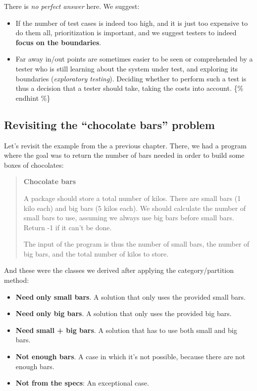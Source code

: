 There is \emph{no perfect answer} here. We suggest:

\begin{itemize}
\tightlist
\item
  If the number of test cases is indeed too high, and it is just too
  expensive to do them all, prioritization is important, and we suggest
  testers to indeed \textbf{focus on the boundaries}.
\item
  Far away in/out points are sometimes easier to be seen or comprehended
  by a tester who is still learning about the system under test, and
  exploring its boundaries (\emph{exploratory testing}). Deciding
  whether to perform such a test is thus a decision that a tester should
  take, taking the costs into account. \{\% endhint \%\}
\end{itemize}

\hypertarget{revisiting-the-chocolate-bars-problem}{%
\subsection{Revisiting the ``chocolate bars''
problem}\label{revisiting-the-chocolate-bars-problem}}

Let's revisit the example from the a previous chapter. There, we had a
program where the goal was to return the number of bars needed in order
to build some boxes of chocolates:

\begin{quote}
\textbf{Chocolate bars}

A package should store a total number of kilos. There are small bars (1
kilo each) and big bars (5 kilos each). We should calculate the number
of small bars to use, assuming we always use big bars before small bars.
Return -1 if it can't be done.

The input of the program is thus the number of small bars, the number of
big bars, and the total number of kilos to store.
\end{quote}

And these were the classes we derived after applying the
category/partition method:

\begin{itemize}
\tightlist
\item
  \textbf{Need only small bars}. A solution that only uses the provided
  small bars.
\item
  \textbf{Need only big bars}. A solution that only uses the provided
  big bars.
\item
  \textbf{Need small + big bars}. A solution that has to use both small
  and big bars.
\item
  \textbf{Not enough bars}. A case in which it's not possible, because
  there are not enough bars.
\item
  \textbf{Not from the specs}: An exceptional case.
\end{itemize}

